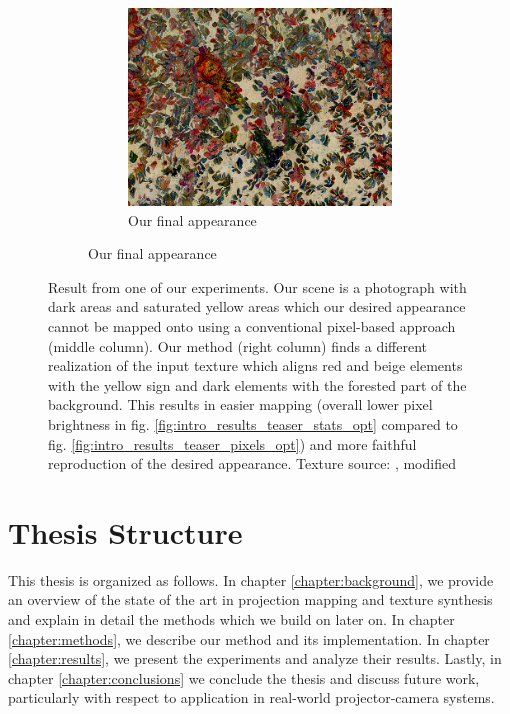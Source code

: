 \begin{figure}[ht]
\begin{subfigure}{\textwidth}
\begin{subfigure}{0.3\textwidth}
            \centering
            \includegraphics[width=\textwidth]{images/01-results_teaser-stats_proj.jpg}
            \caption{Our final appearance}
            \label{fig:intro_results_teaser_stats_proj}
        \end{subfigure}
    \end{subfigure}
    \caption{Result from one of our experiments. Our scene is a photograph with dark areas and saturated yellow areas which our desired appearance cannot be mapped onto using a conventional pixel-based approach (middle column). Our method (right column) finds a different realization of the input texture which aligns red and beige elements with the yellow sign and dark elements with the forested part of the background. This results in easier mapping (overall lower pixel brightness in fig. \ref{fig:intro_results_teaser_stats_opt} compared to fig. \ref{fig:intro_results_teaser_pixels_opt}) and more faithful reproduction of the desired appearance. Texture source: \citet{Pixar128}, modified}
    \label{fig:intro_result_teaser}
\end{figure}

\section{Thesis Structure}
\label{section:intro-thesis_structure}

This thesis is organized as follows. In chapter \ref{chapter:background}, we provide an overview of the state of the art in projection mapping and texture synthesis and explain in detail the methods which we build on later on. In chapter \ref{chapter:methods}, we describe our method and its implementation. In chapter \ref{chapter:results}, we present the experiments and analyze their results. Lastly, in chapter \ref{chapter:conclusions} we conclude the thesis and discuss future work, particularly with respect to application in real-world projector-camera systems.
